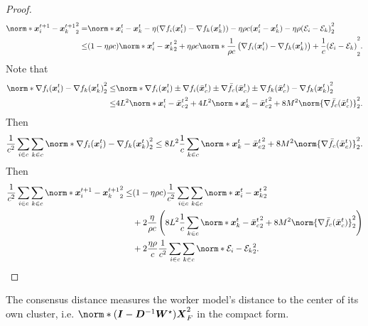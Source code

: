 \documentclass{article}
\begin{document}
\begin{proof}
  \begin{align*}
    \norm*{\xx^{t+1}_i - \xx^{t+1}_k}_2^2
    =& \norm*{\xx^{t}_i - \xx^{t}_k - \eta(\nabla f_i(\xx_i^t) - \nabla f_k(\xx_k^t))
    - \eta \rho c (\xx_i^t - \xx_k^t)
    - \eta \rho (\cE_i - \cE_k)
    }_2^2 \\
    \le& (1-\eta\rho c) \norm*{\xx^{t}_i - \xx^{t}_k}_2^2
    + \eta\rho c \norm*{\frac{1}{\rho c}\left(\nabla f_i(\xx_i^t) - \nabla f_k(\xx_k^t)\right) + \frac{1}{c}(\cE_i - \cE_k)}_2^2.
  \end{align*}
  Note that
  \begin{align*}
    \norm*{\nabla f_i(\xx_i^t) - \nabla f_k(\xx_k^t)}_2^2
    \le& \norm*{\nabla f_i(\xx_i^t) \pm \nabla f_i(\bar{\xx}_c^t) \pm \nabla \bar{f}_c(\bar{\xx}_c^t)  \pm \nabla f_k(\bar{\xx}_c^t) - \nabla f_k(\xx_k^t)}_2^2 \\
    \le& 4 L^2 \norm*{\xx_i^t - \bar{\xx}_c^t}_2^2 + 4 L^2 \norm*{\xx_k^t - \bar{\xx}_c^t}_2^2 + 8 M^2 \norm{\nabla \bar{f}_c(\bar{\xx}_c^t)}_2^2.
  \end{align*}
  Then
  \begin{align*}
    \frac{1}{c^2}\sum_{i\in c} \sum_{k\in c}\norm*{\nabla f_i(\xx_i^t) - \nabla f_k(\xx_k^t)}_2^2 \le 8L^2 \frac{1}{c}\sum_{k\in c} \norm*{\xx_k^t - \bar{\xx}_c^t}_2^2 + 8 M^2 \norm{\nabla \bar{f}_c(\bar{\xx}_c^t)}_2^2.
  \end{align*}
  Then
  \begin{align*}
    \frac{1}{c^2}\sum_{i\in c} \sum_{k\in c} \norm*{\xx^{t+1}_i - \xx^{t+1}_k}_2^2
    \le& (1-\eta\rho c) \frac{1}{c^2}\sum_{i\in c} \sum_{k\in c} \norm*{\xx^{t}_i - \xx^{t}_k}_2^2 \\
    &+ 2 \frac{\eta}{\rho c} \left(8L^2 \frac{1}{c}\sum_{k\in c} \norm*{\xx_k^t - \bar{\xx}_c^t}_2^2 + 8 M^2 \norm{\nabla \bar{f}_c(\bar{\xx}_c^t)}_2^2 \right) \\
    &+ 2 \frac{\eta\rho}{c} \frac{1}{c^2}\sum_{i\in c} \sum_{k\in c}\norm*{\cE_i - \cE_k}_2^2.
  \end{align*}
\end{proof}

\begin{lemma}
  The consensus distance measures the worker model's distance to the center of its own cluster, i.e. $\norm*{(\mI - \mD^{-1}\mW^\star) \mX}_F^2$ in the compact form.
\end{lemma}
\end{document}
